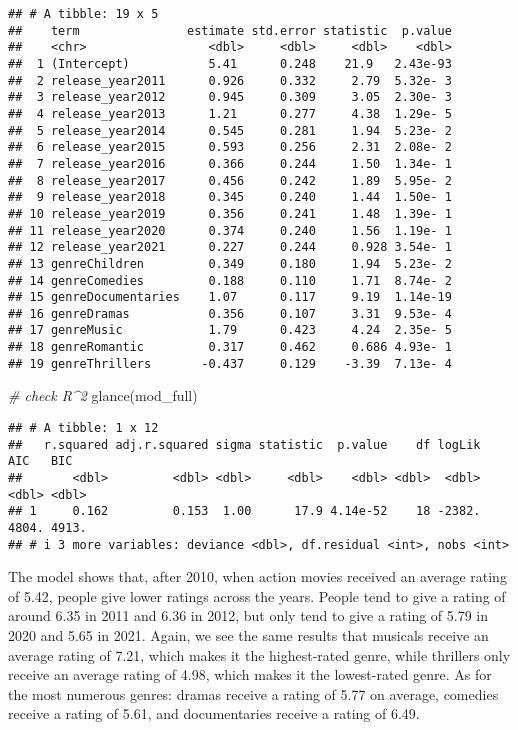 \documentclass[
]{article}
\newenvironment{Shaded}{\begin{snugshade}}{\end{snugshade}}
\newcommand{\CommentTok}[1]{\textcolor[rgb]{0.56,0.35,0.01}{\textit{#1}}}
\newcommand{\FunctionTok}[1]{\textcolor[rgb]{0.00,0.00,0.00}{#1}}
\newcommand{\NormalTok}[1]{#1}
\begin{document}
\begin{verbatim}
## # A tibble: 19 x 5
##    term               estimate std.error statistic  p.value
##    <chr>                 <dbl>     <dbl>     <dbl>    <dbl>
##  1 (Intercept)           5.41      0.248    21.9   2.43e-93
##  2 release_year2011      0.926     0.332     2.79  5.32e- 3
##  3 release_year2012      0.945     0.309     3.05  2.30e- 3
##  4 release_year2013      1.21      0.277     4.38  1.29e- 5
##  5 release_year2014      0.545     0.281     1.94  5.23e- 2
##  6 release_year2015      0.593     0.256     2.31  2.08e- 2
##  7 release_year2016      0.366     0.244     1.50  1.34e- 1
##  8 release_year2017      0.456     0.242     1.89  5.95e- 2
##  9 release_year2018      0.345     0.240     1.44  1.50e- 1
## 10 release_year2019      0.356     0.241     1.48  1.39e- 1
## 11 release_year2020      0.374     0.240     1.56  1.19e- 1
## 12 release_year2021      0.227     0.244     0.928 3.54e- 1
## 13 genreChildren         0.349     0.180     1.94  5.23e- 2
## 14 genreComedies         0.188     0.110     1.71  8.74e- 2
## 15 genreDocumentaries    1.07      0.117     9.19  1.14e-19
## 16 genreDramas           0.356     0.107     3.31  9.53e- 4
## 17 genreMusic            1.79      0.423     4.24  2.35e- 5
## 18 genreRomantic         0.317     0.462     0.686 4.93e- 1
## 19 genreThrillers       -0.437     0.129    -3.39  7.13e- 4
\end{verbatim}

\begin{Shaded}
\begin{Highlighting}[]
\CommentTok{\# check R\^{}2}
\FunctionTok{glance}\NormalTok{(mod\_full)}
\end{Highlighting}
\end{Shaded}

\begin{verbatim}
## # A tibble: 1 x 12
##   r.squared adj.r.squared sigma statistic  p.value    df logLik   AIC   BIC
##       <dbl>         <dbl> <dbl>     <dbl>    <dbl> <dbl>  <dbl> <dbl> <dbl>
## 1     0.162         0.153  1.00      17.9 4.14e-52    18 -2382. 4804. 4913.
## # i 3 more variables: deviance <dbl>, df.residual <int>, nobs <int>
\end{verbatim}

The model shows that, after 2010, when action movies received an average
rating of 5.42, people give lower ratings across the years. People tend
to give a rating of around 6.35 in 2011 and 6.36 in 2012, but only tend
to give a rating of 5.79 in 2020 and 5.65 in 2021. Again, we see the
same results that musicals receive an average rating of 7.21, which
makes it the highest-rated genre, while thrillers only receive an
average rating of 4.98, which makes it the lowest-rated genre. As for
the most numerous genres: dramas receive a rating of 5.77 on average,
comedies receive a rating of 5.61, and documentaries receive a rating of
6.49.
\end{document}
